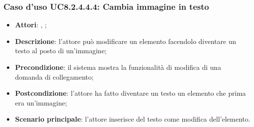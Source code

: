 		\subsubsection{Caso d'uso UC8.2.4.4.4: Cambia immagine in testo}
		\label{UC8.2.4.4.4}
		\begin{itemize}
			\item \textbf{Attori}: \uau, \uaupro;
			\item \textbf{Descrizione}: l'attore può modificare un elemento facendolo diventare un testo al posto di un'immagine;
			\item \textbf{Precondizione}: il sistema mostra la funzionalità di modifica di una domanda di collegamento; 
			\item \textbf{Postcondizione}: l'attore ha fatto diventare un testo un elemento che prima era un'immagine;
			\item \textbf{Scenario principale}: l'attore inserisce del testo come modifica dell'elemento.  
		\end{itemize}